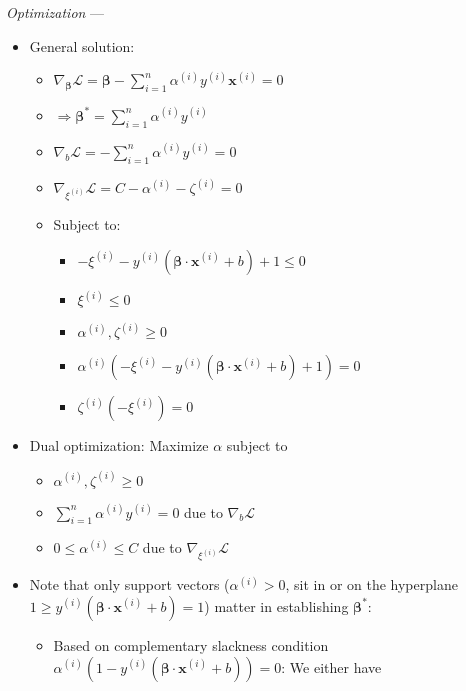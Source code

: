 \emph{Optimization} ---
\begin{itemize}
    \item General solution:
    \begin{itemize}
        \item $\nabla_{\boldsymbol{\beta}} \mathcal{L} =  \boldsymbol{\beta} - \sum_{i=1}^n \alpha^{(i)} y^{(i)} \boldsymbol{x}^{(i)} = 0$
        \item $\Rightarrow \boldsymbol{\beta}^{*} = \sum_{i=1}^n \alpha^{(i)} y^{(i)}$
        \item $\nabla_b \mathcal{L} = - \sum_{i=1}^n \alpha^{(i)} y^{(i)} = 0$
        \item $\nabla_{\xi^{(i)}} \mathcal{L} = C - \alpha^{(i)} - \zeta^{(i)} = 0$
        \item Subject to:
        \begin{itemize}
            \item $- \xi^{(i)} - y^{(i)} (\boldsymbol{\beta} \cdot \boldsymbol{x}^{(i)} + b) + 1 \leq 0$
            \item $\xi^{(i)} \leq 0$
            \item $\alpha^{(i)}, \zeta^{(i)} \geq 0$
            \item $\alpha^{(i)} (- \xi^{(i)} - y^{(i)} (\boldsymbol{\beta} \cdot \boldsymbol{x}^{(i)} + b) + 1) = 0$
            \item $\zeta^{(i)} (- \xi^{(i)}) = 0$
        \end{itemize}
    \end{itemize}
    \item Dual optimization: Maximize $\alpha$ subject to 
    \begin{itemize}
        \item $\alpha^{(i)}, \zeta^{(i)} \geq 0$ 
        \item $\sum_{i=1}^n \alpha^{(i)} y^{(i)} = 0$ due to $\nabla_b \mathcal{L}$
        \item $0 \leq \alpha^{(i)} \leq C$ due to $\nabla_{\xi^{(i)}} \mathcal{L}$ 
    \end{itemize}
    \item Note that only support vectors ($\alpha^{(i)} > 0$, sit in or on the hyperplane $ 1 \geq y^{(i)} (\boldsymbol{\beta} \cdot \boldsymbol{x}^{(i)} + b) = 1$) matter in establishing $\boldsymbol{\beta}^{*}$:
    \begin{itemize}
        \item Based on complementary slackness condition $\alpha^{(i)} (1 - y^{(i)} (\boldsymbol{\beta} \cdot \boldsymbol{x}^{(i)} + b)) = 0$: We either have 

\end{itemize}
\end{itemize}

